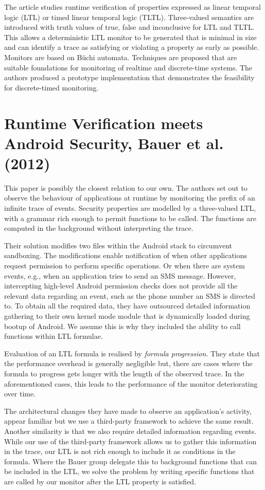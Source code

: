 The article studies runtime verification of properties expressed as linear temporal logic (LTL) or timed linear temporal logic (TLTL).  Three-valued semantics are introduced with truth values of true, false and inconclusive for LTL and TLTL.  This allows a deterministic LTL monitor to be generated that is minimal in size and can identify a trace as satisfying or violating a property as early as possible.  Monitors are based on B\"{u}chi automata.  Techniques are proposed that are suitable foundations for monitoring of realtime and discrete-time systems.  The authors produced a prototype implementation that demonstrates the feasibility for discrete-timed monitoring.

\section{Runtime Verification meets Android Security, Bauer et al. (2012) \cite{bauer2012runtime}}

This paper is possibly the closest relation to our own.  The authors set out to observe the behaviour of applications at runtime by monitoring the prefix of an infinite trace of events.  Security properties are modelled by a three-valued LTL, with a grammar rich enough to permit functions to be called.  The functions are computed in the background without interpreting the trace.

Their solution modifies two files within the Android stack to circumvent sandboxing.  The modifications enable notification of when other applications request permission to perform specific operations.  Or when there are system events, e.g., when an application tries to send an SMS message.  However, intercepting high-level Android permission checks does not provide all the relevant data regarding an event, such as the phone number an SMS is directed to.  To obtain all the required data, they have outsourced detailed information gathering to their own kernel mode module that is dynamically loaded during bootup of Android.  We assume this is why they included the ability to call functions within LTL formulae.

Evaluation of an LTL formula is realised by \textit{formula progression}.  They state that the performance overhead is generally negligible but, there are cases where the formula to progress gets longer with the length of the observed trace.  In the aforementioned cases, this leads to the performance of the monitor deteriorating over time.

The architectural changes they have made to observe an application's activity, appear familiar but we use a third-party framework to achieve the same result.  Another similarity is that we also require detailed information regarding events.  While our use of the third-party framework allows us to gather this information in the trace, our LTL is not rich enough to include it as conditions in the formula.  Where the Bauer group delegate this to background functions that can be included in the LTL, we solve the problem by writing specific functions that are called by our monitor after the LTL property is satisfied.

